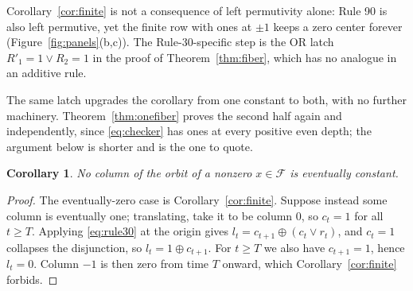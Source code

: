 \documentclass[11pt]{article}
\newtheorem{corollary}[theorem]{Corollary}
\newcommand{\F}{\mathcal F}
\begin{document}
Corollary~\ref{cor:finite} is not a consequence of left permutivity alone:
Rule 90 is also left permutive, yet the finite row with ones at $\pm1$ keeps a
zero center forever (Figure~\ref{fig:panels}(b,c)).  The Rule-30-specific step
is the OR latch $R'_1=1\lor R_2=1$ in the proof of Theorem~\ref{thm:fiber},
which has no analogue in an additive rule.

The same latch upgrades the corollary from one constant to both, with no
further machinery.  Theorem~\ref{thm:onefiber} proves the second half again and
independently, since \eqref{eq:checker} has ones at every positive even depth;
the argument below is shorter and is the one to quote.

\begin{corollary}\label{cor:constant}
No column of the orbit of a nonzero $x\in\F$ is eventually constant.
\end{corollary}
\begin{proof}
The eventually-zero case is Corollary~\ref{cor:finite}.  Suppose instead some
column is eventually one; translating, take it to be column $0$, so $c_t=1$ for
all $t\geq T$.  Applying \eqref{eq:rule30} at the origin gives
$l_t=c_{t+1}\oplus(c_t\lor r_t)$, and $c_t=1$ collapses the disjunction, so
$l_t=1\oplus c_{t+1}$.  For $t\geq T$ we also have $c_{t+1}=1$, hence $l_t=0$.
Column $-1$ is then zero from time $T$ onward, which
Corollary~\ref{cor:finite} forbids.
\end{proof}
\end{document}
